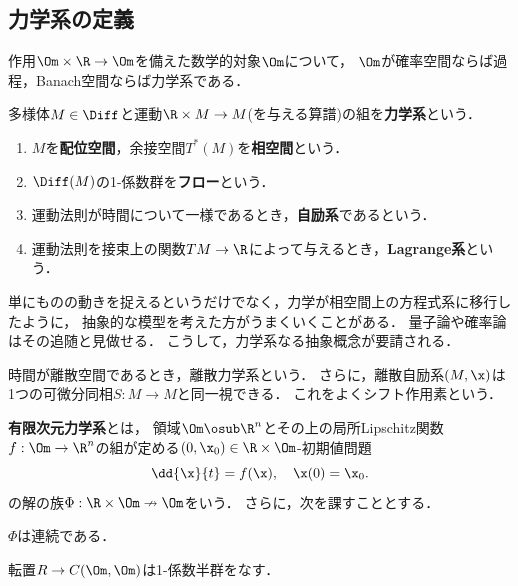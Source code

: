\documentclass[uplatex,dvipdfmx]{jsreport}
\begin{document}
\subsection{力学系の定義}

\begin{tcolorbox}[colframe=ForestGreen, colback=ForestGreen!10!white,breakable,colbacktitle=ForestGreen!40!white,coltitle=black,fonttitle=\bfseries\sffamily,
title=]
    作用$\Om\times\R\to\Om$を備えた数学的対象$\Om$について，
    $\Om$が確率空間ならば過程，Banach空間ならば力学系である．
\end{tcolorbox}

\begin{definition}
    多様体$M\in\Diff$と運動$\R\times M\to M$(を与える算譜)の組を\textbf{力学系}という．
    \begin{enumerate}
        \item $M$を\textbf{配位空間}，余接空間$T^*(M)$を\textbf{相空間}という．
        \item $\Diff(M)$の1-係数群を\textbf{フロー}という．
        \item 運動法則が時間について一様であるとき，\textbf{自励系}であるという．
        \item 運動法則を接束上の関数$TM\to\R$によって与えるとき，\textbf{Lagrange系}という．
    \end{enumerate}
\end{definition}
\begin{remarks}
    単にものの動きを捉えるというだけでなく，力学が相空間上の方程式系に移行したように，
    抽象的な模型を考えた方がうまくいくことがある．
    量子論や確率論はその追随と見做せる．
    こうして，力学系なる抽象概念が要請される．
\end{remarks}

\begin{example}
    時間が離散空間であるとき，離散力学系という．
    さらに，離散自励系$(M,\x)$は1つの可微分同相$S:M\to M$と同一視できる．
    これをよくシフト作用素という．
\end{example}

\begin{example}
    \textbf{有限次元力学系}とは，
    領域$\Om\osub\R^n$とその上の局所Lipschitz関数$f:\Om\to\R^n$の組が定める$(0,\x_0)\in\R\times\Om$-初期値問題
    \[\dd{\x}{t}=f(\x),\quad\x(0)=\x_0.\]
    の解の族$\Phi:\R\times\Om\nrightarrow\Om$をいう．
    さらに，次を課すこととする．
    \begin{enumerate}[{[DS}1{]}]
        \item $\Phi$は連続である．
        \item 転置$R\to C(\Om,\Om)$は1-係数半群をなす．
    \end{enumerate}
\end{example}
\end{document}
